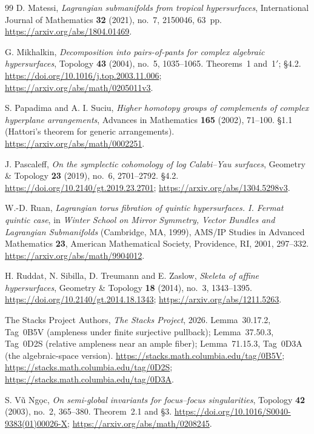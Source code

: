 \begin{thebibliography}{99}
D. Matessi,
\emph{Lagrangian submanifolds from tropical hypersurfaces},
International Journal of Mathematics \textbf{32} (2021), no.~7, 2150046, 63~pp.
\url{https://arxiv.org/abs/1804.01469}.

G. Mikhalkin,
\emph{Decomposition into pairs-of-pants for complex algebraic hypersurfaces},
Topology \textbf{43} (2004), no.~5, 1035--1065.
Theorems~1 and~1$'$; \S4.2.
\url{https://doi.org/10.1016/j.top.2003.11.006};
\url{https://arxiv.org/abs/math/0205011v3}.

S. Papadima and A. I. Suciu,
\emph{Higher homotopy groups of complements of complex hyperplane arrangements},
Advances in Mathematics \textbf{165} (2002), 71--100.
\S1.1 (Hattori's theorem for generic arrangements).
\url{https://arxiv.org/abs/math/0002251}.

J. Pascaleff,
\emph{On the symplectic cohomology of log Calabi--Yau surfaces},
Geometry \& Topology \textbf{23} (2019), no.~6, 2701--2792.
\S4.2.
\url{https://doi.org/10.2140/gt.2019.23.2701};
\url{https://arxiv.org/abs/1304.5298v3}.

W.-D. Ruan,
\emph{Lagrangian torus fibration of quintic hypersurfaces. I. Fermat quintic case},
in \emph{Winter School on Mirror Symmetry, Vector Bundles and Lagrangian Submanifolds}
(Cambridge, MA, 1999), AMS/IP Studies in Advanced Mathematics \textbf{23},
American Mathematical Society, Providence, RI, 2001, 297--332.
\url{https://arxiv.org/abs/math/9904012}.

H. Ruddat, N. Sibilla, D. Treumann and E. Zaslow,
\emph{Skeleta of affine hypersurfaces},
Geometry \& Topology \textbf{18} (2014), no.~3, 1343--1395.
\url{https://doi.org/10.2140/gt.2014.18.1343};
\url{https://arxiv.org/abs/1211.5263}.

The Stacks Project Authors,
\emph{The Stacks Project}, 2026.
Lemma~30.17.2, Tag~0B5V (ampleness under finite surjective pullback);
Lemma~37.50.3, Tag~0D2S (relative ampleness near an ample fiber);
Lemma~71.15.3, Tag~0D3A (the algebraic-space version).
\url{https://stacks.math.columbia.edu/tag/0B5V};
\url{https://stacks.math.columbia.edu/tag/0D2S};
\url{https://stacks.math.columbia.edu/tag/0D3A}.

S. Vũ Ngọc,
\emph{On semi-global invariants for focus--focus singularities},
Topology \textbf{42} (2003), no.~2, 365--380.
Theorem~2.1 and \S3.
\url{https://doi.org/10.1016/S0040-9383(01)00026-X};
\url{https://arxiv.org/abs/math/0208245}.


\end{thebibliography}

